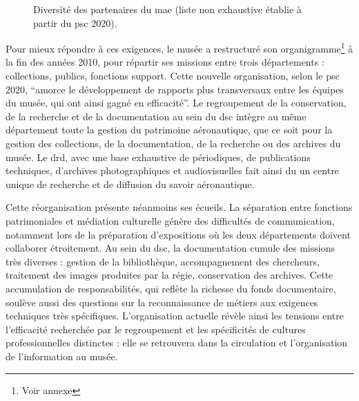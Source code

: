 \begin{figure}[htbp]
	
	\caption{Diversité des partenaires du \ac{mae} (liste non exhaustive établie à partir du \ac{psc} 2020).}
	\label{fig:schem_partenaires}
\end{figure}

Pour mieux répondre à ces exigences, le musée a restructuré son organigramme\footnote{Voir annexe } à la fin des années 2010, pour répartir ses missions entre trois départements : collections, publics, fonctions support. Cette nouvelle organisation, selon le \ac{psc} 2020, \enquote{amorce le développement de rapports plus transversaux entre les équipes du musée, qui ont ainsi gagné en efficacité}. Le regroupement de la conservation, de la recherche et de la documentation au sein du \ac{dsc} intègre au même département toute la gestion du patrimoine aéronautique, que ce soit pour la gestion des collections, de la documentation, de la recherche  ou des archives du musée. Le \ac{drd}, avec une base exhaustive de périodiques, de publications techniques, d'archives photographiques et audiovisuelles fait ainsi du \mae un centre unique de recherche et de diffusion du savoir aéronautique.

Cette réorganisation présente néanmoins ses écueils. La séparation entre fonctions patrimoniales et médiation culturelle génère des difficultés de communication, notamment lors de la préparation d'expositions où les deux départements doivent collaborer étroitement. Au sein du \ac{dsc}, la documentation cumule des missions très diverses : gestion de la bibliothèque, accompagnement des chercheurs, traitement des images produites par la régie, conservation des archives. Cette accumulation de responsabilités, qui reflète la richesse du fonds documentaire, soulève aussi des questions sur la reconnaissance de métiers aux exigences techniques très spécifiques. L'organisation actuelle révèle ainsi les tensions entre l'efficacité recherchée par le regroupement et les spécificités de cultures professionnelles distinctes : elle se retrouvera dans la circulation et l'organisation de l'information au musée.